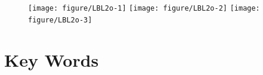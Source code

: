 \documentclass[11pt, chapterprefix=true]{scrbook}\usepackage[]{graphicx}\usepackage[]{color}
\newenvironment{knitrout}{}{} %
\begin{document}
% 

\vspace{2cm}

\begin{figure}[ht]

\begin{knitrout}\footnotesize
{}\color{fgcolor}

{\centering \texttt{[image: figure/LBL2o-1]} 
\texttt{[image: figure/LBL2o-2]} 
\texttt{[image: figure/LBL2o-3]} 

}



\end{knitrout}

\end{figure}

\newpage 

\section{Key Words}
\end{document}
